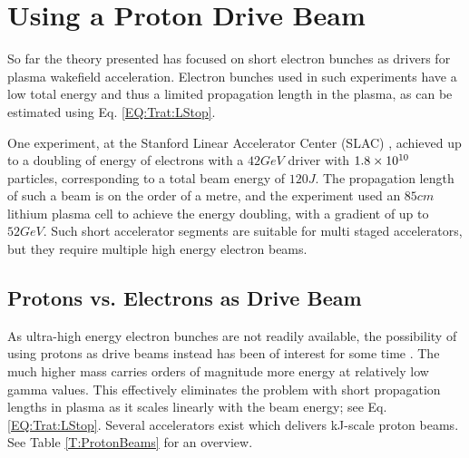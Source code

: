 \section{Using a Proton Drive Beam}
\label{Int:DBeam}

So far the theory presented has focused on short electron bunches as drivers for plasma wakefield acceleration. Electron bunches used in such experiments have a low total energy and thus a limited propagation length in the plasma, as can be estimated using Eq. \ref{EQ:Trat:LStop}.

One experiment, at the Stanford Linear Accelerator Center (SLAC) \cite{blumenfeld:2007}, achieved up to a doubling of energy of electrons with a $42\unit{GeV}$ driver with $1.8\times 10^{10}$ particles, corresponding to a total beam energy of $120\unit{J}$. The propagation length of such a beam is on the order of a metre, and the experiment used an $85\unit{cm}$ lithium plasma cell to achieve the energy doubling, with a gradient of up to $52\unit{GeV}$. Such short accelerator segments are suitable for multi staged accelerators, but they require multiple high energy electron beams. 

\subsection{Protons vs. Electrons as Drive Beam}
\label{Int:DBeam:PDPWFA}

As ultra-high energy electron bunches are not readily available, the possibility of using protons as drive beams instead has been of interest for some time \cite{blue:2003,caldwell:2009}. The much higher mass carries orders of magnitude more energy at relatively low gamma values. This effectively eliminates the problem with short propagation lengths in plasma as it scales linearly with the beam energy; see Eq. \ref{EQ:Trat:LStop}. Several accelerators exist which delivers kJ-scale proton beams. See Table \ref{T:ProtonBeams} for an overview.

